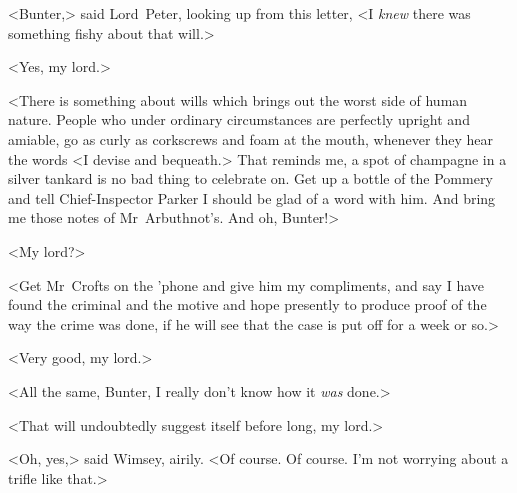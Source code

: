 \divider

<Bunter,> said Lord~Peter, looking up from this letter, <I \emph{knew} there was something fishy about that will.>

<Yes, my lord.>

<There is something about wills which brings out the worst side of human nature. People who under ordinary circumstances are perfectly upright and amiable, go as curly as corkscrews and foam at the mouth, whenever they hear the words <I devise and bequeath.> That reminds me, a spot of champagne in a silver tankard is no bad thing to celebrate on. Get up a bottle of the Pommery and tell Chief-Inspector Parker I should be glad of a word with him. And bring me those notes of Mr~Arbuthnot's. And oh, Bunter!>

<My lord?>

<Get Mr~Crofts on the 'phone and give him my compliments, and say I have found the criminal and the motive and hope presently to produce proof of the way the crime was done, if he will see that the case is put off for a week or so.>

<Very good, my lord.>

<All the same, Bunter, I really don't know how it \emph{was} done.>

<That will undoubtedly suggest itself before long, my lord.>

<Oh, yes,> said Wimsey, airily. <Of course. Of course. I'm not worrying about a trifle like that.>